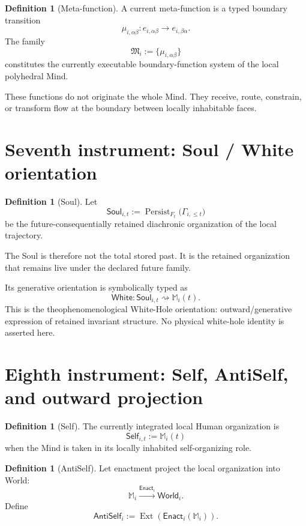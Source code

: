 \documentclass[10pt]{article}
\theoremstyle{pe}
\theoremstyle{definition}
\newtheorem{definition}[theorem]{Definition}
\newcommand{\Persist}{\operatorname{Persist}}
\newcommand{\Ext}{\operatorname{Ext}}
\newcommand{\World}{\mathsf{World}}
\newcommand{\Soul}{\mathsf{Soul}}
\newcommand{\Self}{\mathsf{Self}}
\newcommand{\AntiSelf}{\mathsf{AntiSelf}}
\newcommand{\White}{\mathsf{White}}
\begin{document}
\begin{definition}[Meta-function]
A current meta-function is a typed boundary transition
\[
  \mu_{i,\alpha\beta}:
  e_{i,\alpha\beta}
  \longrightarrow
  e_{i,\beta\alpha}.
\]
The family
\[
  \mathfrak M_i
  :=
  \{\mu_{i,\alpha\beta}\}
\]
constitutes the currently executable boundary-function system of the local polyhedral Mind.
\end{definition}

These functions do not originate the whole Mind.  They receive, route, constrain, or transform flow at the boundary between locally inhabitable faces.

\section{Seventh instrument: Soul / White orientation}

\begin{definition}[Soul]
Let
\begin{equation}\label{eq:soul}
  \Soul_{i,t}
  :=
  \Persist_{F_t}\bigl(\Gamma_{i,\le t}\bigr)
\end{equation}
be the future-consequentially retained diachronic organization of the local trajectory.
\end{definition}

The Soul is therefore not the total stored past.  It is the retained organization that remains live under the declared future family.

Its generative orientation is symbolically typed as
\[
  \boxed{
  \White:
  \Soul_{i,t}
  \rightsquigarrow
  \mathbb M_i(t).
  }
\]
This is the theophenomenological White-Hole orientation: outward/generative expression of retained invariant structure.  No physical white-hole identity is asserted here.

\section{Eighth instrument: Self, AntiSelf, and outward projection}

\begin{definition}[Self]
The currently integrated local Human organization is
\[
  \Self_{i,t}:=\mathbb M_i(t)
\]
when the Mind is taken in its locally inhabited self-organizing role.
\end{definition}

\begin{definition}[AntiSelf]
Let enactment project the local organization into World:
\[
  \mathbb M_i
  \xrightarrow{\mathsf{Enact}_i}
  \World_i.
\]
Define
\begin{equation}\label{eq:antiself}
  \AntiSelf_i
  :=
  \Ext\!\left(\mathsf{Enact}_i(\mathbb M_i)\right).
\end{equation}
\end{definition}
\end{document}
